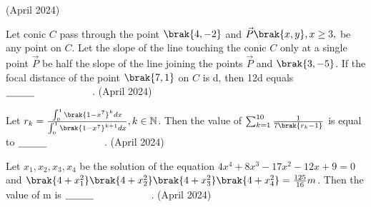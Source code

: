 \hfill{(April 2024)} 
\item Let  conic $C$ pass through the point $\brak{4,-2}$ and $\vec{P}\brak{x,y},x \geq 3,$ be any point on $C$. Let the slope of the line touching the conic $C$ only at a single point $\vec{P}$ be half the slope of the line joining the points $\vec{P}$ and $\brak{3,-5}$. If the focal distance of the point $\brak{7,1}$ on $C$ is d, then 12d equals  $\makebox[3cm][l]{\underline{\hspace{1cm}}}$.
\hfill{(April 2024)} 
\item Let $r_k=\frac{\int_0^1\brak{1-x^7}^kdx}{\int_0^1\brak{1-x^7}^{k+1}dx},k \in \mathbb{N}$. Then the value of $\sum_{k=1}^{10}\frac{1}{7\brak{r_k-1}}$ is equal to $\makebox[3cm][l]{\underline{\hspace{1cm}}}$.
\hfill{(April 2024)} 
\item Let $x_1,x_2,x_3,x_4$ be the solution of the equation $4x^4+8x^3-17x^2-12x+9=0$ and $\brak{4+x_1^2}\brak{4+x_2^2}\brak{4+x_3^2}\brak{4+x_4^2}=\frac{125}{16}m$. Then the value of m is $\makebox[3cm][l]{\underline{\hspace{1cm}}}$.
\hfill{(April 2024)} 

